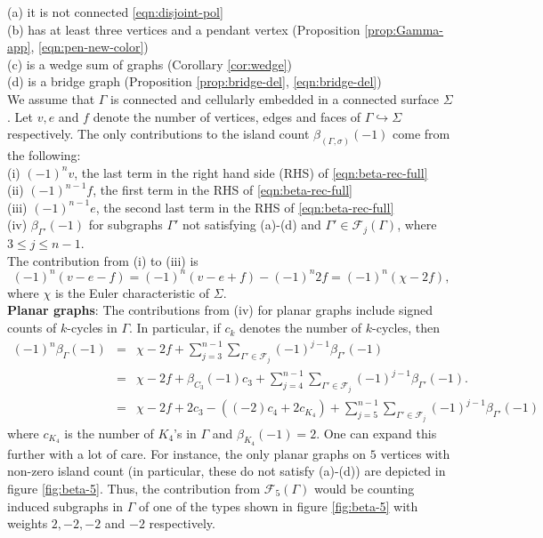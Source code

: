 \documentclass[10pt, reqno]{amsart}
\newcommand{\bgd}{\begin{displaymath}}
\newcommand{\edd}{\end{displaymath}}
\newcommand{\hf}{\hspace*{0.5cm}}
\theoremstyle{plain}
\theoremstyle{remark}
\theoremstyle{definition}
\numberwithin{equation}{section}
\begin{document}
\hf (a) it is not connected \eqref{eqn:disjoint-pol}\\
\hf (b) has at least three vertices and a pendant vertex (Proposition \ref{prop:Gamma-app}, \eqref{eqn:pen-new-color})\\
\hf (c) is a wedge sum of graphs (Corollary \ref{cor:wedge})\\
\hf (d) is a bridge graph (Proposition \ref{prop:bridge-del}, \eqref{eqn:bridge-del})\\
We assume that $\Gamma$ is connected and cellularly embedded in a connected surface $\Sigma$. Let $v, e$ and $f$ denote the number of vertices, edges and faces of $\Gamma\hookrightarrow \Sigma$ respectively. The only contributions to the island count $\beta_{(\Gamma,\sigma)}(-1)$ come from the following: \\
\hf (i) $(-1)^n v$, the last term in the right hand side (RHS) of \eqref{eqn:beta-rec-full}\\
\hf (ii) $(-1)^{n-1}f$, the first term in the RHS of \eqref{eqn:beta-rec-full}\\
\hf (iii) $(-1)^{n-1}e$, the second last term in the RHS of \eqref{eqn:beta-rec-full}\\
\hf (iv) $\beta_{\Gamma'}(-1)$ for subgraphs $\Gamma'$ not satisfying (a)-(d) and $\Gamma'\in\mathscr{F}_j(\Gamma)$, where $3\leq j\leq n-1$. \\
The contribution from (i) to (iii) is
\bgd
(-1)^n(v-e-f)=(-1)^n(v-e+f)-(-1)^n 2f=(-1)^n(\chi -2f),
\edd
where $\chi$ is the Euler characteristic of $\Sigma$. \\
\hf \textbf{Planar graphs}: The contributions from (iv) for planar graphs include signed counts of $k$-cycles in $\Gamma$. In particular, if $c_k$ denotes the number of $k$-cycles, then 
\begin{eqnarray}
(-1)^n\beta_\Gamma(-1) & = & \chi-2f+\sum_{j=3}^{n-1}\sum_{\Gamma'\in \mathscr{F}_j}(-1)^{j-1}\beta_{\Gamma'}(-1)\nonumber \\
& = & \chi-2f+ \beta_{C_3}(-1)c_3+\sum_{j=4}^{n-1}\sum_{\Gamma'\in \mathscr{F}_j}(-1)^{j-1}\beta_{\Gamma'}(-1). \nonumber \\
& = & \chi-2f+2c_3-((-2)c_4+2c_{K_4})+\sum_{j=5}^{n-1}\sum_{\Gamma'\in \mathscr{F}_j}(-1)^{j-1}\beta_{\Gamma'}(-1) \label{eqn:Euler}
\end{eqnarray}
where $c_{K_4}$ is the number of $K_4$'s in $\Gamma$ and $\beta_{K_4}(-1)=2$. One can expand this further with a lot of care. For instance, the only planar graphs on $5$ vertices with non-zero island count (in particular, these do not satisfy (a)-(d)) are depicted in figure \ref{fig:beta-5}. Thus, the contribution from $\mathscr{F}_5(\Gamma)$ would be counting induced subgraphs in $\Gamma$ of one of the types shown in figure \ref{fig:beta-5} with weights $2, -2, -2$ and $-2$ respectively.\\
\end{document}
